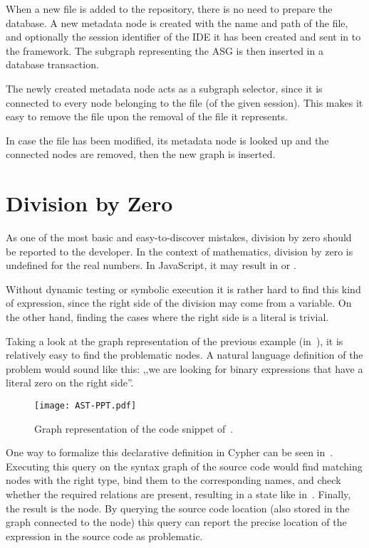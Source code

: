 When a new file is added to the repository, there is no need to prepare the database. A new metadata node is created with the name and path of the file, and optionally the session identifier of the IDE it has been created and sent in to the framework. The subgraph representing the ASG is then inserted in a database transaction.

The newly created metadata node acts as a subgraph selector, since it is connected to every node belonging to the file (of the given session). This makes it easy to remove the file upon the removal of the file it represents.

In case the file has been modified, its metadata node is looked up and the connected nodes are removed, then the new graph is inserted.


\section{Division by Zero}
\label{sect:division-by-zero}
As one of the most basic and easy-to-discover mistakes, division by zero should be reported to the developer. In the context of mathematics, division by zero is undefined for the real numbers. In JavaScript, it may result in  or .

Without dynamic testing or symbolic execution it is rather hard to find this kind of expression, since the right side of the division may come from a variable. On the other hand, finding the cases where the right side is a literal is trivial.

Taking a look at the graph representation of the previous example (in~), it is relatively easy to find the problematic nodes. A natural language definition of the problem would sound like this: ,,we are looking for binary expressions that have a literal zero on the right side''.

\begin{figure}[!htb]
  \centering
  \texttt{[image: AST-PPT.pdf]}
  \caption{Graph representation of the code snippet of~.}
  \label{fig:AST-PPT}
\end{figure}

One way to formalize this declarative definition in Cypher can be seen in~. Executing this query on the syntax graph of the source code would find matching nodes with the right type, bind them to the corresponding names, and check whether the required relations are present, resulting in a state like in~. Finally, the result is the  node. By querying the source code location (also stored in the graph connected to the node) this query can report the precise location of the expression in the source code as problematic.

